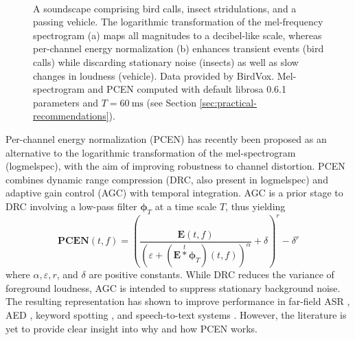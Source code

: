 \documentclass[journal]{IEEEtran}
\theoremstyle{remark}
\begin{document}
\begin{figure}
\centering
{}\\
\caption{A soundscape comprising bird calls, insect stridulations, and a passing vehicle.
The logarithmic transformation of the mel-frequency spectrogram (a) maps all magnitudes to a decibel-like scale, whereas per-channel energy normalization (b) enhances transient events (bird calls) while discarding stationary noise (insects) as well as slow changes in loudness (vehicle). Data provided by BirdVox. Mel-spectrogram and PCEN computed with default librosa 0.6.1 parameters and $T=\SI{60}{\milli\second}$ (see Section \ref{sec:practical-recommendations}).}
\label{fig:spectrogram}
\end{figure} 

Per-channel energy normalization (PCEN) \cite{wang2017icassp} has recently been proposed as an alternative to the logarithmic transformation of the mel-spectrogram (logmelspec), with the aim of improving robustness to channel distortion.
PCEN combines dynamic range compression (DRC, also present in logmelspec) and adaptive gain control (AGC) with temporal integration. AGC is a prior stage to DRC involving a low-pass filter $\mathbf{\phi}_T$ at a time scale $T$, thus yielding
\begin{equation}
\mathbf{PCEN}(t,f) =
\left(\dfrac{\mathbf{E}(t,f)}{(\varepsilon+(\mathbf{E}\overset{t}{\ast}\boldsymbol{\phi}_T)(t,f))^\alpha} + \delta\right)^r - \delta^r
\end{equation}
where $\alpha, \varepsilon, r$, and $\delta$ are positive constants.
While DRC reduces the variance of foreground loudness, AGC is intended to suppress stationary background noise.
The resulting representation has shown to improve performance in far-field ASR \cite{battenberg2017arxiv}, AED \cite{krstulovic2018casse}, keyword spotting \cite{wang2017icassp}, and speech-to-text systems \cite{shan2018attention}. However, the literature is yet to provide clear insight into why and how PCEN works.
\end{document}
